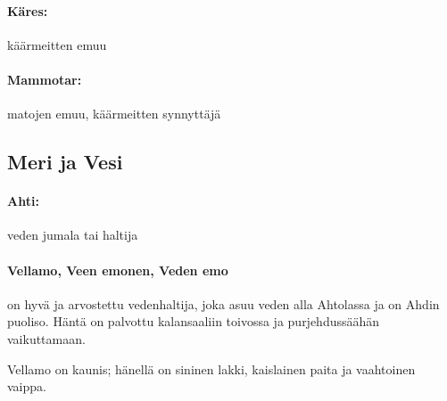     \paragraph{Käres:} käärmeitten emuu  
    \paragraph{Mammotar:} matojen emuu, käärmeitten synnyttäjä


\subsection{Meri ja Vesi}
  \paragraph{Ahti:} veden jumala tai haltija
  \paragraph{Vellamo, Veen emonen, Veden emo} on hyvä ja arvostettu vedenhaltija, joka asuu veden
    alla Ahtolassa ja on Ahdin puoliso. Häntä on palvottu kalansaaliin toivossa ja purjehdussäähän
    vaikuttamaan. \par
    Vellamo on kaunis; hänellä on sininen lakki, kaislainen paita ja vaahtoinen vaippa.
